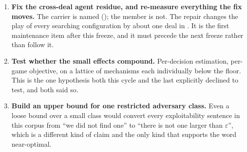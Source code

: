 \begin{enumerate}
\item \textbf{Fix the cross-deal agent residue, and re-measure everything the fix moves.} The carrier
  is named (\texttt{\vsevenSsixCarrier{}}); the member is not. The repair changes the play of every
  searching configuration by about one deal in \vsevenSsixIncidence{}. It is the first maintenance
  item after this freeze, and it must precede the next freeze rather than follow it.
\item \textbf{Test whether the small effects compound.} Per-decision estimation, per-game objective,
  on a lattice of mechanisms each individually below the floor. This is the one hypothesis both this
  cycle and the last explicitly declined to test, and both said so.
\item \textbf{Build an upper bound for one restricted adversary class.} Even a loose bound over a
  small class would convert every exploitability sentence in this corpus from ``we did not find one''
  to ``there is not one larger than $\varepsilon$'', which is a different kind of claim and the only
  kind that supports the word near-optimal.
\end{enumerate}
